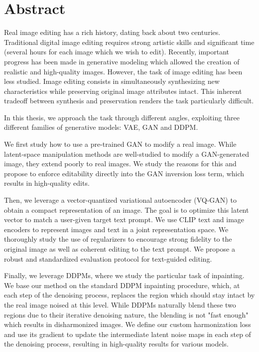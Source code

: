 \cleardoublepage
\setcounter{page}{1}

\chapter{Abstract}

Real image editing has a rich history, dating back about two centuries. Traditional digital image 
editing requires strong artistic skills and significant time (several hours for each image 
which we wish to edit). Recently,  important progress has 
been made in generative modeling which allowed the creation of realistic and high-quality images. 
However, 
the task of image editing has been less studied. Image editing consists in 
simultaneously synthesizing new characteristics while preserving original image attributes intact. 
This inherent tradeoff between synthesis and preservation renders the task particularly difficult.

In this thesis, we approach the task through different angles, exploiting three different families of 
generative models: \ac{VAE}, \ac{GAN} and \ac{DDPM}.

We first study how to use a pre-trained \ac{GAN} to modify a real image.
While latent-space manipulation methods are well-studied to modify a \ac{GAN}-generated image, 
they extend poorly to real images. We study the reasons for this and propose 
to enforce editability directly into the \ac{GAN} inversion loss term, which results in 
high-quality edits.

Then, we leverage a vector-quantized variational autoencoder (VQ-GAN) to obtain a compact representation of an image. 
The goal is to optimize this latent vector to match a user-given target text prompt. We use CLIP text and image encoders
to represent images and text in a joint representation space. We thoroughly study the use of 
regularizers to encourage strong fidelity to the original image as well as coherent editing to the text prompt.
We propose a robust and standardized evaluation protocol for text-guided editing.

Finally, we leverage \ac{DDPM}s, where we study the particular task of inpainting. 
We base our method on the standard \ac{DDPM} inpainting procedure, which, at each step of the denoising process, 
replaces the region which should stay intact by the real image noised at this level. While \ac{DDPM}s naturally blend these two regions due to their iterative 
denoising nature, the blending is not "fast enough" which results in disharmonized images. We define our custom harmonization loss 
and use its gradient to update the intermediate latent noise maps in each step of the denoising process, resulting in high-quality results for various 
models.


